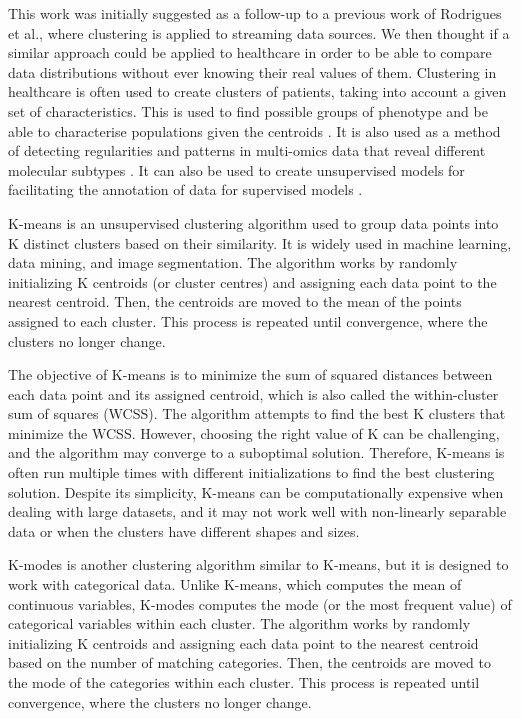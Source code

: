 This work was initially suggested as a follow-up to a previous work of Rodrigues et al., \cite{rodriguesLocalAlgorithmApproximate2018a} where clustering is applied to streaming data sources. We then thought if a similar approach could be applied to healthcare in order to be able to compare data distributions without ever knowing their real values of them.
Clustering in healthcare is often used to create clusters of patients, taking into account a given set of characteristics. This is used to find possible groups of phenotype and be able to characterise populations given the centroids \cite{walkerUnsupervisedLearningTechniques2019,basileInformaticsMachineLearning2018}. It is also used as a method of detecting regularities and patterns in multi-omics data that reveal different molecular subtypes \cite{nicoraIntegratedMultiOmicsAnalyses2020,rappoportMultiomicMultiviewClustering2018}. It can also be used to create unsupervised models for facilitating the annotation of data for supervised models \cite{mcalpineUtilityUnsupervisedMachine2022}. 

K-means \cite{lloydLeastSquaresQuantization1982,steinley2007initializing,macqueen1967classification} is an unsupervised clustering algorithm used to group data points into K distinct clusters based on their similarity. It is widely used in machine learning, data mining, and image segmentation. The algorithm works by randomly initializing K centroids (or cluster centres) and assigning each data point to the nearest centroid. Then, the centroids are moved to the mean of the points assigned to each cluster. This process is repeated until convergence, where the clusters no longer change.

The objective of K-means is to minimize the sum of squared distances between each data point and its assigned centroid, which is also called the within-cluster sum of squares (WCSS). The algorithm attempts to find the best K clusters that minimize the WCSS. However, choosing the right value of K can be challenging, and the algorithm may converge to a suboptimal solution. Therefore, K-means is often run multiple times with different initializations to find the best clustering solution. Despite its simplicity, K-means can be computationally expensive when dealing with large datasets, and it may not work well with non-linearly separable data or when the clusters have different shapes and sizes.

K-modes is another clustering algorithm similar to K-means, but it is designed to work with categorical data. Unlike K-means, which computes the mean of continuous variables, K-modes computes the mode (or the most frequent value) of categorical variables within each cluster. The algorithm works by randomly initializing K centroids and assigning each data point to the nearest centroid based on the number of matching categories. Then, the centroids are moved to the mode of the categories within each cluster. This process is repeated until convergence, where the clusters no longer change.

